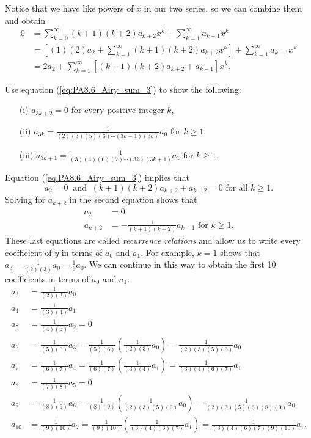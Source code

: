 \begin{exercises}
\begin{exerciseSolution}
Notice that we have like powers of $x$ in our two series, so we can combine them and obtain
\begin{align*}
0 &= \sum_{k=0}^{\infty} (k+1)(k+2)a_{k+2}x^{k} + \sum_{k=1}^{\infty} a_{k-1}x^{k} \\
    &= \left[(1)(2)a_2 + \sum_{k=1}^{\infty} (k+1)(k+2)a_{k+2}x^{k} \right] + \sum_{k=1}^{\infty} a_{k-1}x^{k} \\
    &= 2a_2 + \sum_{k=1}^{\infty} \left[(k+1)(k+2)a_{k+2}+a_{k-1} \right] x^{k}.
\end{align*}

\end{exerciseSolution}

    \item Use equation (\ref{eq:PA8.6_Airy_sum_3}) to show the following:
    \begin{itemize}
    \item[(i)] $a_{3k+2} = 0$ for every positive integer $k$,
    \item[(ii)] $a_{3k} = \frac{1}{(2)(3)(5)(6) \cdots (3k-1)(3k)} a_0 \text{ for } k \geq 1$,
    \item[(iii)] $a_{3k+1} = \frac{1}{(3)(4)(6)(7) \cdots (3k)(3k+1)} a_1 \text{ for } k \geq 1$.
    \end{itemize}

\begin{exerciseSolution}

Equation (\ref{eq:PA8.6_Airy_sum_3}) implies that
\[a_2 = 0 \ \text{ and } \ (k+1)(k+2)a_{k+2}+a_{k-2} = 0 \text{ for all } k \geq 1.\]
Solving for $a_{k+2}$ in the second equation shows that
\begin{align*}
a_2 &= 0 \\
a_{k+2} &= -\frac{1}{(k+1)(k+2)}a_{k-1} \text{ for }  k \geq 1.
\end{align*}
These last equations are called \emph{recurrence relations} and allow us to write every coefficient of $y$ in terms of $a_0$ and $a_1$. For example, $k=1$ shows that $a_3 = \frac{1}{(2)(3)} a_0 = \frac{1}{6}a_0$. We can continue in this way to obtain the first 10 coefficients in terms of $a_0$ and $a_1$:
\begin{align*}
a_3 &= \frac{1}{(2)(3)}a_0 \\
a_4 &= \frac{1}{(3)(4)}a_1 \\
a_5 &= \frac{1}{(4)(5)} a_2 = 0 \\
a_6 &= \frac{1}{(5)(6)} a_3 = \frac{1}{(5)(6)} \left(\frac{1}{(2)(3)} a_0 \right) = \frac{1}{(2)(3)(5)(6)} a_0 \\
a_7 &= \frac{1}{(6)(7)} a_4 = \frac{1}{(6)(7)} \left(\frac{1}{(3)(4)} a_1 \right) = \frac{1}{(3)(4)(6)(7)} a_1 \\
a_8 &= \frac{1}{(7)(8)} a_5 = 0 \\
a_9 &= \frac{1}{(8)(9)} a_6 = \frac{1}{(8)(9)} \left(\frac{1}{(2)(3)(5)(6)} a_0 \right) = \frac{1}{(2)(3)(5)(6)(8)(9)} a_0 \\
a_{10} &= \frac{1}{(9)(10)} a_7 = \frac{1}{(9)(10)} \left(\frac{1}{(3)(4)(6)(7)} a_1 \right) = \frac{1}{(3)(4)(6)(7)(9)(10)} a_1.
\end{align*}


\end{exerciseSolution}
\end{exercises}
